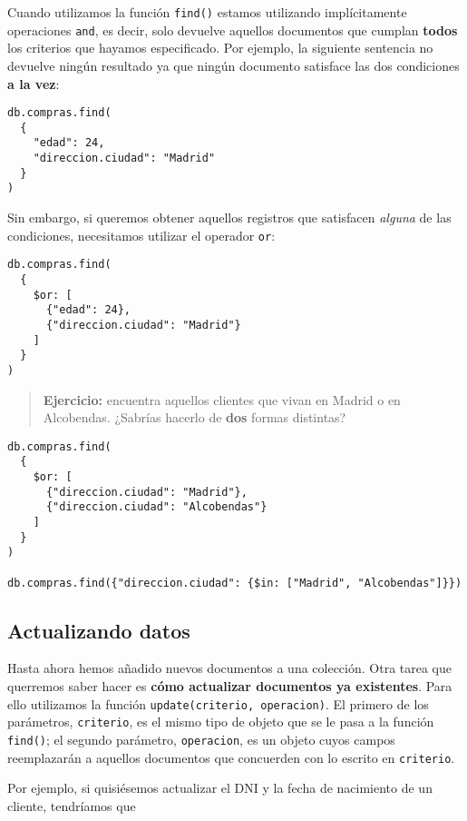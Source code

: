 \documentclass[]{article}
\begin{document}
Cuando utilizamos la función \texttt{find()} estamos utilizando
implícitamente operaciones \texttt{and}, es decir, solo devuelve
aquellos documentos que cumplan \textbf{todos} los criterios que hayamos
especificado. Por ejemplo, la siguiente sentencia no devuelve ningún
resultado ya que ningún documento satisface las dos condiciones
\textbf{a la vez}:

\begin{verbatim}
db.compras.find(
  {
    "edad": 24,
    "direccion.ciudad": "Madrid"
  }
)
\end{verbatim}

Sin embargo, si queremos obtener aquellos registros que satisfacen
\emph{alguna} de las condiciones, necesitamos utilizar el operador
\texttt{or}:

\begin{verbatim}
db.compras.find(
  {
    $or: [
      {"edad": 24},
      {"direccion.ciudad": "Madrid"}
    ]
  }
)
\end{verbatim}

\begin{quote}
\textbf{Ejercicio:} encuentra aquellos clientes que vivan en Madrid o en
Alcobendas. ¿Sabrías hacerlo de \textbf{dos} formas distintas?
\end{quote}

\begin{verbatim}
db.compras.find(
  {
    $or: [
      {"direccion.ciudad": "Madrid"},
      {"direccion.ciudad": "Alcobendas"}
    ]
  }
)

db.compras.find({"direccion.ciudad": {$in: ["Madrid", "Alcobendas"]}})
\end{verbatim}

\hypertarget{actualizando-datos}{%
\subsection{Actualizando datos}\label{actualizando-datos}}

Hasta ahora hemos añadido nuevos documentos a una colección. Otra tarea
que querremos saber hacer es \textbf{cómo actualizar documentos ya
existentes}. Para ello utilizamos la función
\texttt{update(criterio,\ operacion)}. El primero de los parámetros,
\texttt{criterio}, es el mismo tipo de objeto que se le pasa a la
función \texttt{find()}; el segundo parámetro, \texttt{operacion}, es un
objeto cuyos campos reemplazarán a aquellos documentos que concuerden
con lo escrito en \texttt{criterio}.

Por ejemplo, si quisiésemos actualizar el DNI y la fecha de nacimiento
de un cliente, tendríamos que
\end{document}
